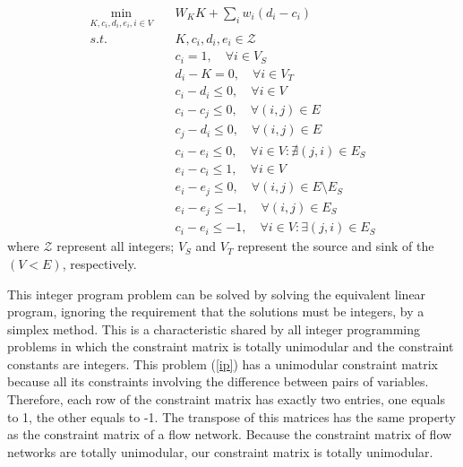 \documentclass[review]{siamart0216}
\begin{document}
\begin{equation} \label{ip} \begin{split}
    \min_{K,c_i,d_i,e_i,i\in V} \quad & W_K K + \sum_i w_i (d_i - c_i) \\
    s.t. \quad & K,c_i,d_i,e_i\in \mathcal{Z}\\
    & c_i = 1,\quad \forall i \in V_S \\
    & d_i - K = 0,\quad \forall i \in V_T \\
    & c_i - d_i \le 0,\quad \forall i\in V \\
    & c_i - c_j \le 0,\quad \forall (i,j)\in E \\
    & c_j - d_i \le 0,\quad \forall (i,j)\in E \\
    & c_i - e_i \le 0,\quad \forall i\in V: \nexists (j,i)\in E_S \\
    & e_i - c_i \le 1,\quad \forall i\in V \\
    & e_i - e_j \le 0,\quad \forall (i,j)\in E \setminus E_S \\
    & e_i - e_j \le -1,\quad \forall (i,j)\in E_S \\
    & c_i - e_i \le -1,\quad \forall i\in V: \exists (j,i)\in E_S
\end{split} \end{equation}
where $\mathcal{Z}$ represent all integers;
$V_S$ and $V_T$ represent the source and sink of the $(V<E)$, respectively.

This integer program problem can be solved by solving the equivalent linear
program, ignoring the requirement that the solutions must be integers,
by a simplex method.  This is a characteristic shared by all integer
programming problems in which the constraint matrix is totally
unimodular\cite{} and the constraint constants are integers.
This problem (\ref{ip}) has a unimodular constraint matrix because all its
constraints involving the difference between pairs of variables\cite{}.
Therefore, each row of the constraint matrix has exactly two entries, one
equals to 1, the other equals to -1.  The transpose of this matrices
has the same property as the constraint matrix of a flow network.
Because the constraint matrix of flow networks are totally
unimodular\cite{}, our constraint matrix is totally unimodular.
\end{document}
